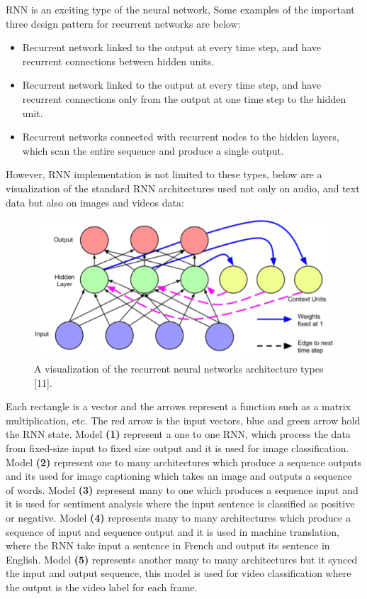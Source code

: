 RNN is an exciting type of the neural network, 
Some examples of the important three design pattern for recurrent networks are below:
\begin{itemize}
    \item Recurrent network linked to the output at every time step, and have recurrent connections between hidden units.
    \item Recurrent network linked to the output at every time step, and have recurrent connections only from the output at one time step to the hidden unit.
    \item Recurrent networks connected with recurrent nodes to the hidden layers, which scan the entire sequence and produce a single output.
\end{itemize} 
However, RNN implementation is not limited to these types, below are a visualization of the standard RNN architectures used not only on audio, and text data but also on images and videos data:
\begin{figure}[ht]
\centering
\includegraphics{Figures/rnn}
\decoRule
\caption[A visualization of the recurrent neural networks architectures types"11".]{A visualization of the recurrent neural networks architecture types [11].}
\label{fig:la}
\end{figure}
Each rectangle is a vector and the arrows represent a function such as a matrix multiplication, etc. The red arrow is the input vectors, blue and green arrow hold the RNN state. Model \textbf{(1)} represent a one to one RNN, which process the data from fixed-size input to fixed size output and it is used for image classification. Model \textbf{(2)} represent one to many architectures which produce a sequence outputs and its used for image captioning which takes an image and outputs a sequence of words. Model \textbf{(3)} represent many to one which produces a sequence input and it is used for sentiment analysis where the input sentence is classified as positive or negative. Model \textbf{(4)} represents many to many architectures which produce a sequence of input and sequence output and it is used in machine translation, where the RNN take input a sentence in French and output its sentence in English. Model \textbf{(5)} represents another many to many architectures but it synced the input and output sequence, this model is used for video classification where the output is the video label for each frame.\\

